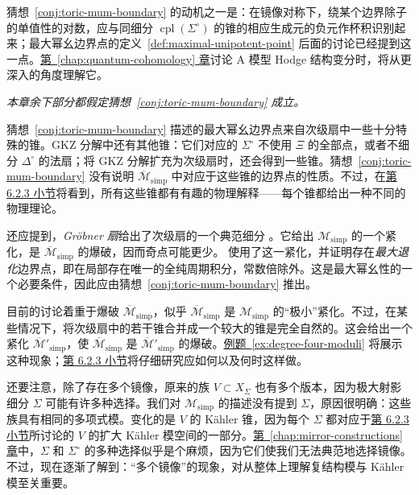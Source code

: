 猜想~\ref{conj:toric-mum-boundary} 的动机之一是：在镜像对称下，绕某个边界除子的单值性的对数，应与同细分 $\operatorname{cpl}(\Sigma^\circ)$ 的锥的相应生成元的负元作杯积识别起来；最大幂幺边界点的定义~\ref{def:maximal-unipotent-point} 后面的讨论已经提到这一点。\hyperref[chap:quantum-cohomology]{第~\ref*{chap:quantum-cohomology} 章}讨论 A 模型 Hodge 结构变分时，将从更深入的角度理解它。

\emph{本章余下部分都假定猜想~\ref{conj:toric-mum-boundary} 成立。}

猜想~\ref{conj:toric-mum-boundary} 描述的最大幂幺边界点来自次级扇中一些十分特殊的锥。GKZ 分解中还有其他锥：它们对应的 $\Sigma^\circ$ 不使用 $\Xi$ 的全部点，或者不细分 $\Delta^\circ$ 的法扇；将 GKZ 分解扩充为次级扇时，还会得到一些锥。猜想~\ref{conj:toric-mum-boundary} 没有说明 $\overline{\mathcal M}_{\mathrm{simp}}$ 中对应于这些锥的边界点的性质。不过，在\hyperref[subsec:enlarged-kahler-moduli]{第 6.2.3 小节}将看到，所有这些锥都有有趣的物理解释——每个锥都给出一种不同的物理理论。

还应提到，\emph{Gröbner 扇}给出了次级扇的一个典范细分 。它给出 $\mathcal M_{\mathrm{simp}}$ 的一个紧化，是 $\overline{\mathcal M}_{\mathrm{simp}}$ 的爆破，因而奇点可能更少。 使用了这一紧化，并证明存在\emph{最大退化}边界点，即在局部存在唯一的全纯周期积分，常数倍除外。这是最大幂幺性的一个必要条件，因此应由猜想~\ref{conj:toric-mum-boundary} 推出。

目前的讨论着重于爆破 $\overline{\mathcal M}_{\mathrm{simp}}$，似乎 $\overline{\mathcal M}_{\mathrm{simp}}$ 是 $\mathcal M_{\mathrm{simp}}$ 的“极小”紧化。不过，在某些情况下，将次级扇中的若干锥合并成一个较大的锥是完全自然的。这会给出一个紧化 $\overline{\mathcal M}'_{\mathrm{simp}}$，使 $\overline{\mathcal M}_{\mathrm{simp}}$ 是 $\overline{\mathcal M}'_{\mathrm{simp}}$ 的爆破。\hyperref[ex:degree-four-moduli]{例题~\ref*{ex:degree-four-moduli}} 将展示这种现象；\hyperref[subsec:enlarged-kahler-moduli]{第 6.2.3 小节}将仔细研究应如何以及何时这样做。

还要注意，除了存在多个镜像，原来的族 $V\subset X_\Sigma$ 也有多个版本，因为极大射影细分 $\Sigma$ 可能有许多种选择。我们对 $\mathcal M_{\mathrm{simp}}$ 的描述没有提到 $\Sigma$，原因很明确：这些族具有相同的多项式模。变化的是 $V$ 的 Kähler 锥，因为每个 $\Sigma$ 都对应于\hyperref[subsec:enlarged-kahler-moduli]{第 6.2.3 小节}所讨论的 $V$ 的扩大 Kähler 模空间的一部分。\hyperref[chap:mirror-constructions]{第~\ref*{chap:mirror-constructions} 章}中，$\Sigma$ 和 $\Sigma^\circ$ 的多种选择似乎是个麻烦，因为它们使我们无法典范地选择镜像。不过，现在逐渐了解到：“多个镜像”的现象，对从整体上理解复结构模与 Kähler 模至关重要。

